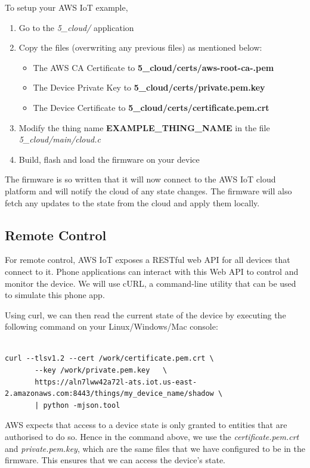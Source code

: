 \documentclass[main.tex]{subfiles}
\begin{document}
To setup your AWS IoT example, 
\begin{enumerate}
    \item Go to the \textit{5\_cloud/} application
    \item Copy the files (overwriting any previous files) as mentioned below:
    \begin{itemize}
        \item The AWS CA Certificate to \textbf{5\_cloud/certs/aws-root-ca-.pem}
        \item The Device Private Key to \textbf{5\_cloud/certs/private.pem.key}
        \item The Device Certificate to \textbf{5\_cloud/certs/certificate.pem.crt}
    \end{itemize}
    \item Modify the thing name \textbf{EXAMPLE\_THING\_NAME} in the file \textit{5\_cloud/main/cloud.c}
    \item Build, flash and load the firmware on your device
\end{enumerate}

The firmware is so written that it will now connect to the AWS IoT cloud platform and will notify the cloud of any state changes. The firmware will also fetch any updates to the state from the cloud and apply them locally. 

\subsection{Remote Control}
For remote control, AWS IoT exposes a RESTful web API for all devices that connect to it. Phone applications can interact with this Web API to control and monitor the device. We will use cURL, a command-line utility that can be used to simulate this phone app. 

Using curl, we can then read the current state of the device by executing the following command on your Linux/Windows/Mac console:
\begin{verbatim}

curl --tlsv1.2 --cert /work/certificate.pem.crt \
       --key /work/private.pem.key   \
       https://aln7lww42a72l-ats.iot.us-east-2.amazonaws.com:8443/things/my_device_name/shadow \ 
       | python -mjson.tool

\end{verbatim}

AWS expects that access to a device state is only granted to entities that are authorised to do so. Hence in the command above, we use the \textit{certificate.pem.crt} and \textit{private.pem.key}, which are the same files that we have configured to be in the firmware. This ensures that we can access the device's state.
\end{document}

